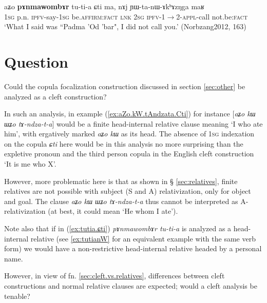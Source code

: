\documentclass[oneside,a4paper,11pt]{article}
\newcommand{\zh}[1]{{\cn #1}}
\newcommand{\fl}{$\rightarrow$}
\begin{document}
\begin{exe}
\ex \label{ex:tutia.ɕti}
\gll aʑo \textbf{pɤnmawombɤr} tu-ti-a ɕti ma, nɤj ɲɯ-ta-nɯ-ɤkʰɤzŋga maʁ  \\
\textsc{1sg} p.n. \textsc{ipfv}-say-\textsc{1sg} be.\textsc{affirm}:\textsc{fact} \textsc{lnk} \textsc{2sg} \textsc{ipfv}-1\fl{}2-\textsc{appl}-call not.be:\textsc{fact} \\
\glt `What I said was ``Padma 'Od 'bar", I did not call you.' (Norbzang2012, 163)
\end{exe}

\section{Question}
Could the copula focalization construction discussed in section \ref{sec:other} be analyzed as a cleft construction? 


In such an analysis, in example (\ref{ex:aZo.kW.tAndzata.Cti}) for instance  [\textit{aʑo kɯ ɯʑo tɤ-ndza-t-a}] would be a finite head-internal relative clause meaning `I who ate him', with ergatively marked \textit{aʑo kɯ} as its head. The absence of \textsc{1sg} indexation on the copula \textit{ɕti} here would be in this analysis no more surprising than the expletive pronoun and the third person copula in the English cleft construction `It is me who X'. 

However, more problematic here is that as shown in § \ref{sec:relatives}, finite relatives are not possible with subject (S and A) relativization, only for object and goal. The clause \textit{aʑo kɯ ɯʑo tɤ-ndza-t-a} thus cannot be interpreted as A-relativization (at best, it could mean `He whom I ate'). 

Note also that if in (\ref{ex:tutia.ɕti}) \textit{pɤnmawombɤr tu-ti-a} is analyzed as a head-internal relative (see \ref{ex:tutianW} for an equivalent example with the same verb form) we would have a non-restrictive head-internal relative headed by a personal name.

However, in view of fn. \ref{sec:cleft.vs.relatives}, differences between cleft constructions and normal relative clauses are expected; would a cleft analysis be tenable?

 
%



 
\end{document}
